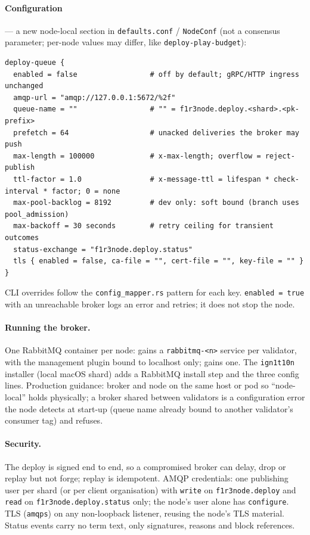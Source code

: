 \documentclass[11pt]{article}
\newcommand{\code}[1]{\texttt{#1}}
\begin{document}
\paragraph{Configuration} --- a new node-local section in \code{defaults.conf} /
\code{NodeConf} (not a consensus parameter; per-node values may differ, like
\code{deploy-play-budget}):
\begin{lstlisting}
deploy-queue {
  enabled = false                 # off by default; gRPC/HTTP ingress unchanged
  amqp-url = "amqp://127.0.0.1:5672/%2f"
  queue-name = ""                 # "" = f1r3node.deploy.<shard>.<pk-prefix>
  prefetch = 64                   # unacked deliveries the broker may push
  max-length = 100000             # x-max-length; overflow = reject-publish
  ttl-factor = 1.0                # x-message-ttl = lifespan * check-interval * factor; 0 = none
  max-pool-backlog = 8192         # dev only: soft bound (branch uses pool_admission)
  max-backoff = 30 seconds        # retry ceiling for transient outcomes
  status-exchange = "f1r3node.deploy.status"
  tls { enabled = false, ca-file = "", cert-file = "", key-file = "" }
}
\end{lstlisting}
CLI overrides follow the \code{config\_mapper.rs} pattern for each key.
\code{enabled = true} with an unreachable broker logs an error and retries; it does
not stop the node.

\paragraph{Running the broker.} One RabbitMQ container per node:
 gains a \code{rabbitmq-<n>} service per validator, with the
management plugin bound to localhost only;  gains one.
The \code{ign1t10n} installer (local macOS shard) adds a RabbitMQ install step and the
three config lines. Production guidance: broker and node on the same host or pod so
``node-local'' holds physically; a broker shared between validators is a
configuration error the node detects at start-up (queue name already bound to another
validator's consumer tag) and refuses.

\paragraph{Security.} The deploy is signed end to end, so a compromised broker can
delay, drop or replay but not forge; replay is idempotent. AMQP credentials: one
publishing user per shard (or per client organisation) with \code{write} on
\code{f1r3node.deploy} and \code{read} on \code{f1r3node.deploy.status} only; the
node's user alone has \code{configure}. TLS (\code{amqps}) on any non-loopback
listener, reusing the node's TLS material. Status events carry no term text, only
signatures, reasons and block references.
\end{document}
